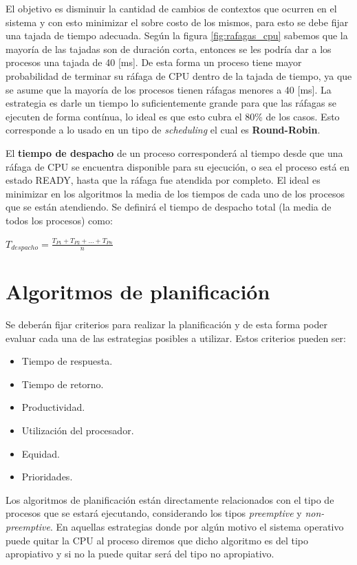 El objetivo es disminuir la cantidad de cambios de contextos que ocurren en el
sistema y con esto minimizar el sobre costo de los mismos, para esto se debe
fijar una tajada de tiempo adecuada. Según la figura \ref{fig:rafagas_cpu}
sabemos que la mayoría de las tajadas son de duración corta, entonces se les
podría dar a los procesos una tajada de 40 [ms]. De esta forma un proceso tiene
mayor probabilidad de terminar su ráfaga de CPU dentro de la tajada de tiempo,
ya que se asume que la mayoría de los procesos tienen ráfagas menores a 40 [ms].
La estrategia es darle un tiempo lo suficientemente grande para que las ráfagas
se ejecuten de forma contínua, lo ideal es que esto cubra el 80\% de los casos.
Esto corresponde a lo usado en un tipo de \textit{scheduling} el cual es
\textbf{Round-Robin}.

El \textbf{tiempo de despacho} de un proceso corresponderá al tiempo desde que
una ráfaga de CPU se encuentra disponible para su ejecución, o sea el proceso
está en estado READY, hasta que la ráfaga fue atendida por completo. El ideal es
minimizar en los algoritmos la media de los tiempos de cada uno de los procesos
que se están atendiendo. Se definirá el tiempo de despacho total (la media de
todos los procesos) como:

$T_{despacho} = \frac{T_{P1}+T_{P2}+...+T_{Pn}}{n}$

\section{Algoritmos de planificación}

Se deberán fijar criterios para realizar la planificación y de esta forma poder
evaluar cada una de las estrategias posibles a utilizar. Estos criterios pueden
ser:

\begin{itemize}
	\item Tiempo de respuesta.
	\item Tiempo de retorno.
	\item Productividad.
	\item Utilización del procesador.
	\item Equidad.
	\item Prioridades.
\end{itemize}

Los algoritmos de planificación están directamente relacionados con el tipo de
procesos que se estará ejecutando, considerando los tipos \textit{preemptive} y
\textit{non-preemptive}. En aquellas estrategias donde por algún motivo el
sistema operativo puede quitar la CPU al proceso diremos que dicho algoritmo es
del tipo apropiativo y si no la puede quitar será del tipo no apropiativo.

